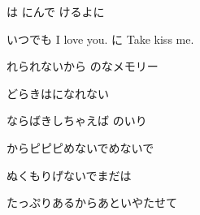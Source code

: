 \documentclass[14pt]{ltjsarticle}
\begin{document}
{  は にんで けるよに
  \jisho{}

  いつでも I love you. に Take kiss me.
  \jisho{}

  れられないから のなメモリー
  \jisho{}

  どらきはになれない
  \jisho{}

  ならばきしちゃえば のいり
  \jisho{}

  からピピピめないでめないで
  \jisho{}

  ぬくもりげないでまだは
  \jisho{}

  たっぷりあるからあといやたせて
  \jisho{}

  
}
\end{document}
